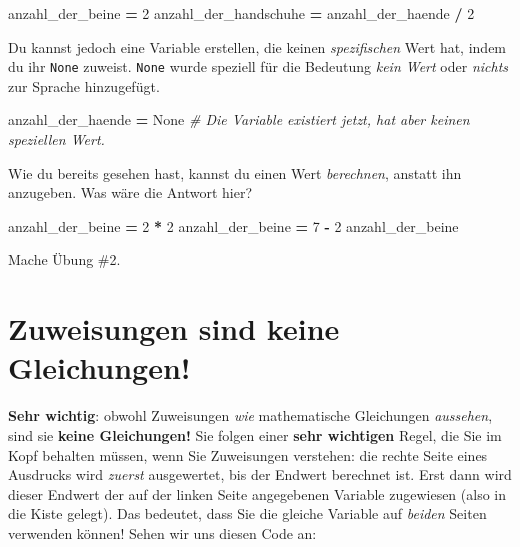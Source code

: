 \documentclass[
]{book}
\newenvironment{Shaded}{\begin{snugshade}}{\end{snugshade}}
\newcommand{\CommentTok}[1]{\textcolor[rgb]{0.56,0.35,0.01}{\textit{#1}}}
\newcommand{\DecValTok}[1]{\textcolor[rgb]{0.00,0.00,0.81}{#1}}
\newcommand{\NormalTok}[1]{#1}
\newcommand{\OperatorTok}[1]{\textcolor[rgb]{0.81,0.36,0.00}{\textbf{#1}}}
\newcommand{\VariableTok}[1]{\textcolor[rgb]{0.00,0.00,0.00}{#1}}
\begin{document}
\begin{Shaded}
\begin{Highlighting}[]
\NormalTok{anzahl\_der\_beine }\OperatorTok{=} \DecValTok{2}
\NormalTok{anzahl\_der\_handschuhe }\OperatorTok{=}\NormalTok{ anzahl\_der\_haende }\OperatorTok{/} \DecValTok{2}
\end{Highlighting}
\end{Shaded}

Du kannst jedoch eine Variable erstellen, die keinen \emph{spezifischen} Wert hat, indem du ihr \texttt{None} zuweist. \texttt{None} wurde speziell für die Bedeutung \emph{kein Wert} oder \emph{nichts} zur Sprache hinzugefügt.

\begin{Shaded}
\begin{Highlighting}[]
\NormalTok{anzahl\_der\_haende }\OperatorTok{=} \VariableTok{None} \CommentTok{\# Die Variable existiert jetzt, hat aber keinen speziellen Wert.}
\end{Highlighting}
\end{Shaded}

Wie du bereits gesehen hast, kannst du einen Wert \emph{berechnen}, anstatt ihn anzugeben. Was wäre die Antwort hier?

\begin{Shaded}
\begin{Highlighting}[]
\NormalTok{anzahl\_der\_beine }\OperatorTok{=} \DecValTok{2} \OperatorTok{*} \DecValTok{2}
\NormalTok{anzahl\_der\_beine }\OperatorTok{=} \DecValTok{7} \OperatorTok{{-}} \DecValTok{2}
\NormalTok{anzahl\_der\_beine}
\end{Highlighting}
\end{Shaded}

Mache Übung \#2.

\hypertarget{zuweisungen-sind-keine-gleichungen}{%
\section{Zuweisungen sind keine Gleichungen!}\label{zuweisungen-sind-keine-gleichungen}}

\textbf{Sehr wichtig}: obwohl Zuweisungen \emph{wie} mathematische Gleichungen \emph{aussehen}, sind sie \textbf{keine Gleichungen!} Sie folgen einer \textbf{sehr wichtigen} Regel, die Sie im Kopf behalten müssen, wenn Sie Zuweisungen verstehen: die rechte Seite eines Ausdrucks wird \emph{zuerst} ausgewertet, bis der Endwert berechnet ist. Erst dann wird dieser Endwert der auf der linken Seite angegebenen Variable zugewiesen (also in die Kiste gelegt). Das bedeutet, dass Sie die gleiche Variable auf \emph{beiden} Seiten verwenden können! Sehen wir uns diesen Code an:
\end{document}
